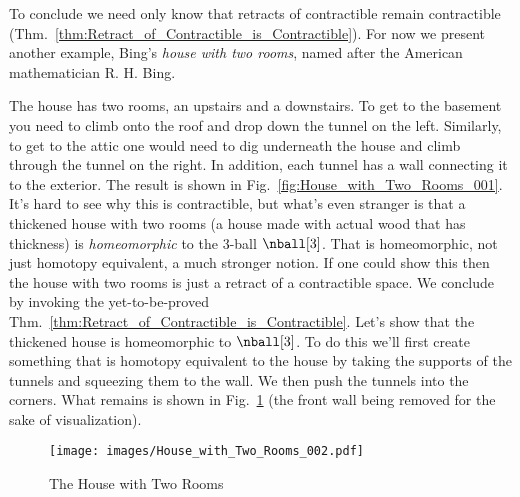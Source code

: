 \documentclass{book}                                                           %
\begin{document}
                \par\vspace{2.5ex}
                To conclude we need only know that retracts of contractible
                remain contractible
                (Thm.~\ref{thm:Retract_of_Contractible_is_Contractible}). For
                now we present another example, Bing's
                \textit{house with two rooms}, named after
                the American mathematician R. H. Bing.
                \par\hfill\par
                The house has two rooms, an upstairs and a downstairs. To get to
                the basement you need to climb onto the roof and drop down the
                tunnel on the left. Similarly, to get to the attic one would
                need to dig underneath the house and climb through the tunnel on
                the right. In addition, each tunnel has a wall connecting it to
                the exterior. The result is shown in
                Fig.~\ref{fig:House_with_Two_Rooms_001}. It's hard to see why
                this is contractible, but what's even stranger is that a
                thickened house with two rooms (a house made with actual wood
                that has thickness) is \textit{homeomorphic} to the 3-ball
                $\nball[3]$. That is homeomorphic, not just homotopy equivalent,
                a much stronger notion. If one could show this then the house
                with two rooms is just a retract of a contractible space. We
                conclude by invoking the yet-to-be-proved
                Thm.~\ref{thm:Retract_of_Contractible_is_Contractible}. Let's
                show that the thickened house is homeomorphic to $\nball[3]$. To
                do this we'll first create something that is homotopy equivalent
                to the house by taking the supports of the tunnels and squeezing
                them to the wall. We then push the tunnels into the corners.
                What remains is shown in Fig.~\ref{fig:House_with_Two_Rooms_002}
                (the front wall being removed for the sake of visualization).
                \begin{figure}
                    \centering
                    \captionsetup{type=figure}
                    \texttt{[image: images/House\_with\_Two\_Rooms\_002.pdf]}
                    \caption{The House with Two Rooms}
                    \label{fig:House_with_Two_Rooms_002}
                \end{figure}
                \par\hfill\par
\end{document}
